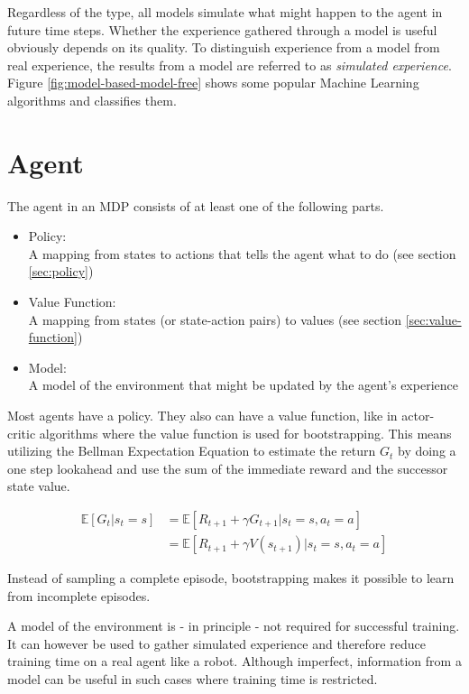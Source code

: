 Regardless of the type, all models simulate what might happen to the agent in future time steps. Whether the experience gathered through a model is useful obviously depends on its quality. To distinguish experience from a model from real experience, the results from a model are referred to as \textit{simulated experience}\cite{SuttonBarto2018}. Figure \ref{fig:model-based-model-free} shows some popular Machine Learning algorithms and classifies them.

\section{Agent}

The agent in an MDP consists of at least one of the following parts.

\begin{itemize}
	\item Policy: \\
	A mapping from states to actions that tells the agent what to do (see section \ref{sec:policy})
	\item Value Function: \\
	A mapping from states (or state-action pairs) to values (see section \ref{sec:value-function})
	\item Model: \\
	A model of the environment that might be updated by the agent's experience
\end{itemize}

Most agents have a policy. They also can have a value function, like in actor-critic algorithms where the value function is used for bootstrapping. This means utilizing the Bellman Expectation Equation to estimate the return $G_t$ by doing a one step lookahead and use the sum of the immediate reward and the successor state value.

\begin{align}
\mathbb{E}[G_t|s_t=s] &= \mathbb{E}[R_{t+1} + \gamma G_{t+1}|s_t=s, a_t=a] \\
&=\mathbb{E}[R_{t+1}+ \gamma V(s_{t+1})|s_t=s, a_t=a]
\end{align}

Instead of sampling a complete episode, bootstrapping makes it possible to learn from incomplete episodes.

A model of the environment is - in principle - not required for successful training. It can however be used to gather simulated experience and therefore reduce training time on a real agent like a robot. Although imperfect, information from a model can be useful in such cases where training time is restricted.

